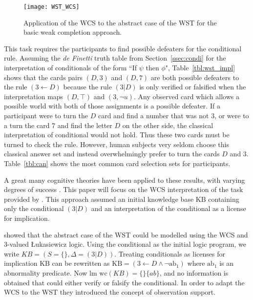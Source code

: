 \begin{figure}
\centering \texttt{[image: WST\_WCS]}
\caption{Application of the WCS to the abstract case of the WST for the basic weak completion approach.}
\label{wst_wcs}
\end{figure}

This task requires the participants to find possible defeaters for the conditional rule. Assuming the \textit{de Finetti} truth table from Section~\ref{ssec:condi} for the interpretation of conditionals of the form ``If $\psi$ then $\phi$", Table~\ref{tbl:wst_impl} shows that the cards pairs $(D,3)$ and $(D,7)$ are both possible defeaters to the rule $(3 \leftarrow D)$ because the rule $(3|D)$ is only verified or falsified when the interpretation maps $(D,\top)$ and $(3, \lnot u)$. Any observed card which allows a possible world with both of those assignments is a possible defeater. If a participant were to turn the $D$ card and find a number that was not $3$, or were to a turn the card $7$ and find the letter $D$ on the other side, the classical interpretation of conditional would not hold. Thus these two cards must be turned to check the rule. However, human subjects very seldom choose this classical answer set and instead overwhelmingly prefer to turn the cards $D$ and $3$. Table~\ref{tbl:can} shows the most common card selection sets for participants.

A great many cognitive theories have been applied to these results, with varying degrees of success \citep{ragni2017formal}. This paper will focus on the WCS interpretation of the task provided by \cite{ragni2017wason}. This approach assumed an initial knowledge base $\text{KB}$ containing only the conditional $(3|D)$ and an interpretation of the conditional as a license for implication.

\cite{dietz2012computational} showed that the abstract case of the WST could be modelled using the WCS and 3-valued \L ukasiewicz logic. Using the conditional as the initial logic program, we write $KB=(S=\{\},\Delta=(3|D))$. Treating conditionals as licenses for implication $\text{KB}$ can be rewritten as $\text{KB}=(3\leftarrow D \land \lnot \text{ab}_1)$ where $\text{ab}_1$ is an abnormality predicate. Now $\textrm{lm wc}(KB)=\{\}\{ab\}$, and no information is obtained that could either verify or falsify the conditional. In order to adapt the WCS to the WST they introduced the concept of observation support.

